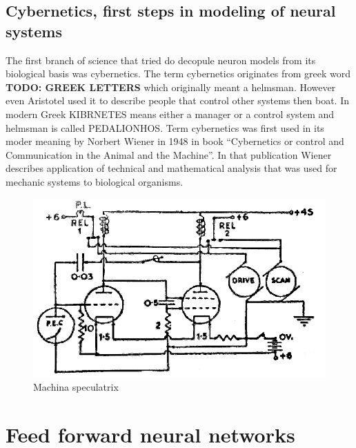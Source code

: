 \subsection{Cybernetics, first steps in modeling of neural systems}
The first branch of science that tried do decopule neuron models from its biological basis was 
cybernetics. The term cybernetics originates from greek word \textbf{TODO: GREEK LETTERS} which
originally meant a helmsman. However even Aristotel used it to describe people that control 
other systems then boat. In modern Greek KIBRNETES means either a manager or a control system and 
helmsman is called PEDALIONHOS.
Term cybernetics was first used in its moder meaning by Norbert Wiener in 1948 in book 
``Cybernetics or control and Communication in the Animal and the Machine''. 
In that publication Wiener describes application of technical and mathematical analysis 
that was used for mechanic systems to biological organisms.
\begin{figure}[ht]
	\includegraphics[width=\textwidth]{res/speculatrix}
	\caption{Machina speculatrix}
	\label{fig:machina_speculatrix}
\end{figure}




\section{Feed forward neural networks}

